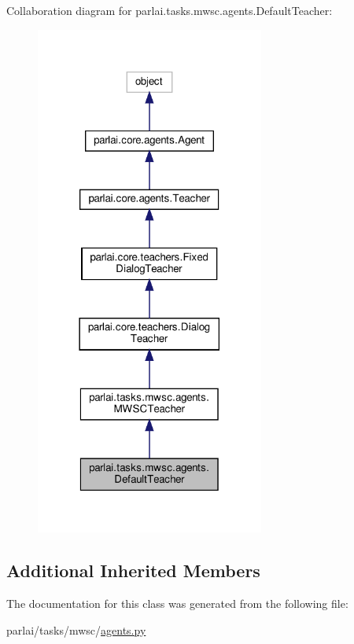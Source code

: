 Collaboration diagram for parlai.\+tasks.\+mwsc.\+agents.\+Default\+Teacher\+:
\nopagebreak
\begin{figure}[H]
\begin{center}
\leavevmode
\includegraphics[width=213pt]{classparlai_1_1tasks_1_1mwsc_1_1agents_1_1DefaultTeacher__coll__graph}
\end{center}
\end{figure}
\subsection*{Additional Inherited Members}


The documentation for this class was generated from the following file\+:\begin{DoxyCompactItemize}
\item 
parlai/tasks/mwsc/\hyperlink{parlai_2tasks_2mwsc_2agents_8py}{agents.\+py}\end{DoxyCompactItemize}
